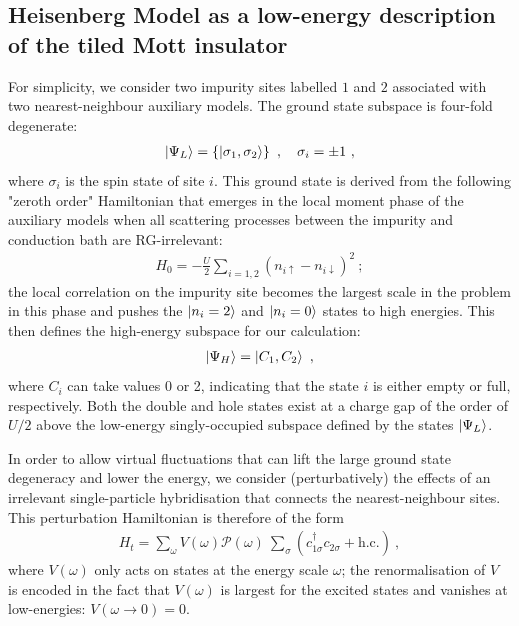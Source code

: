 \documentclass[reprint,hidelinks,onecolumn]{revtex4-2}
\begin{document}
\subsection{Heisenberg Model as a low-energy description of the tiled Mott insulator}\label{heisenbergDerivation}
For simplicity, we consider two impurity sites labelled \(1\) and \(2\) associated with two nearest-neighbour auxiliary models. The ground state subspace is four-fold degenerate:
\begin{equation}\begin{aligned}
	\ket{\Psi_L} = \left\{\ket{\sigma_1,\sigma_2}\right\}~,\quad \sigma_i = \pm 1~,
\end{aligned}\end{equation}
where \(\sigma_i\) is the spin state of site \(i\). This ground state is derived from the following "zeroth order" Hamiltonian that emerges in the local moment phase of the auxiliary models when all scattering processes between the impurity and conduction bath are RG-irrelevant:
\begin{equation}\begin{aligned}
	H_0 = -\frac{U}{2}\sum_{i=1,2}\left(n_{i \uparrow} - n_{i \downarrow}\right)^2~;
\end{aligned}\end{equation}
the local correlation on the impurity site becomes the largest scale in the problem in this phase and pushes the \(\ket{n_i=2}\) and \(\ket{n_i=0}\) states to high energies. This then defines the high-energy subspace for our calculation:
\begin{equation}\begin{aligned}
	\ket{\Psi_H} = \ket{C_1,C_2}~,
\end{aligned}\end{equation}
where \(C_i\) can take values 0 or 2, indicating that the state \(i\) is either empty or full, respectively. Both the double and hole states exist at a charge gap of the order of \(U/2\) above the low-energy singly-occupied subspace defined by the states \(\ket{\Psi_L}\).

In order to allow virtual fluctuations that can lift the large ground state degeneracy and lower the energy, we consider (perturbatively) the effects of an irrelevant single-particle hybridisation that connects the nearest-neighbour sites. This perturbation Hamiltonian is therefore of the form
\begin{equation}\begin{aligned}
	H_t = \sum_\omega V(\omega) \mathcal{P}(\omega)~\sum_\sigma\left(c^\dagger_{1\sigma}c_{2\sigma} + \text{h.c.}\right) ~,
\end{aligned}\end{equation}
where \(V(\omega)\) only acts on states at the energy scale \(\omega\); the renormalisation of \(V\) is encoded in the fact that \(V(\omega)\) is largest for the excited states and vanishes at low-energies: \(V(\omega \to 0) = 0\).
\end{document}
